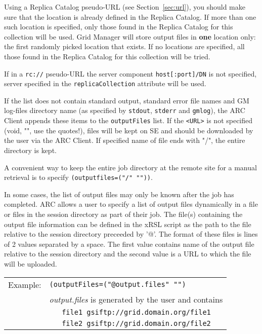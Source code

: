   Using a Replica Catalog pseudo-URL (see Section~\ref{sec:url}), you should make
  sure that the location is already defined in the Replica Catalog. If more
  than one such location is specified, only those found in the Replica Catalog
  for this collection will be used. Grid Manager will store output files in
  \textbf{one} location only: the first randomly picked location that
  exists. If no locations are specified, all those found in the
  Replica Catalog for this collection will be tried.

  If in a \verb#rc://# pseudo-URL the server component \texttt{host[:port]/DN} is not
  specified, server specified in the \texttt{replicaCollection} attribute will be used.

  If the list does not contain standard output, standard error
  file names and GM log-files directory name (as specified by \texttt{stdout},
  \texttt{stderr} and \texttt{gmlog}), the ARC Client appends these
  items to the \texttt{outputFiles} list. If the \verb#<URL># is not specified (void,
  "", use the quotes!), files will be kept on SE and should be downloaded 
  by the user via the ARC Client. If specified name of file ends with "/", the 
  entire directory is kept.

  A convenient way to keep the entire job directory at the remote site
  for a manual retrieval is to specify \texttt{(outputfiles=("/" ""))}.

  In some cases, the list of output files may only be known after the
  job has completed. ARC allows a user to specify a list of output
  files dynamically in a file or files in the session directory as
  part of their job. The file(s) containing the output file
  information can be defined in the xRSL script as the path to the
  file relative to the session directory preceeded by '@'. The format
  of these files is lines of 2 values separated by a space. The first
  value contains name of the output file relative to the session
  directory and the second value is a URL to which the file will be
  uploaded.

  \begin{tabular}{lp{13cm}}
    Example:&\verb#(outputFiles=("@output.files" "")#\\
    & \emph{output.files} is generated by the user and contains \\
    &\verb#   file1 gsiftp://grid.domain.org/file1#\\
    &\verb#   file2 gsiftp://grid.domain.org/file2#\\
  \end{tabular}

